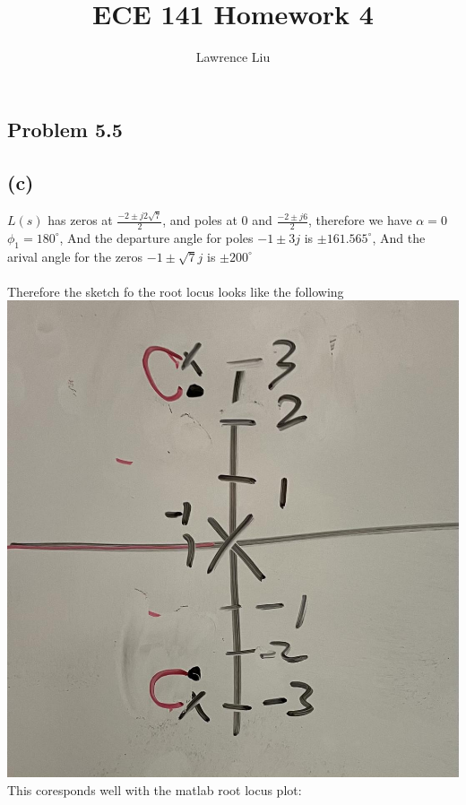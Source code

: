 \documentclass[12pt]{article}
\title{ECE 141 Homework 4}
\author{Lawrence Liu}
\begin{document}
\maketitle
\subsection*{Problem 5.5}
\subsection*{(c)}
$L(s)$ has zeros at $\frac{-2\pm j2\sqrt{7}}{2}$, and poles at $0$ and $\frac{-2\pm j6}{2}$, therefore we have $\alpha=0$
$\phi_{1}=180^{\circ}$, 
And the departure angle for poles $-1\pm3j$ is $\pm161.565^{\circ}$, And the arival angle for the zeros $-1\pm\sqrt{7}j$ is $\pm200^{\circ}$\\\\
Therefore the sketch fo the root locus looks like the following
\\
\includegraphics[scale=.15]{Problem1Sketch1.jpg}
\\This coresponds well with the matlab root locus plot:\\
\end{document}
